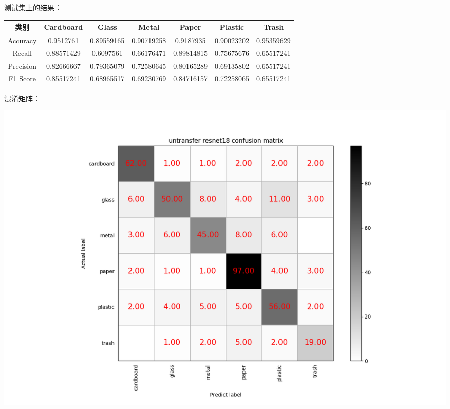 \documentclass[UTF8]{ctexart}
\begin{document}
测试集上的结果：

\begin{tabular}{|c|c|c|c|c|c|c|}
\hline 
类别 & Cardboard & Glass & Metal & Paper & Plastic & Trash \\ 
\hline 
Accuracy &0.9512761 & 0.89559165& 0.90719258& 0.9187935 & 0.90023202& 0.95359629\\
 \hline 
Recall &0.88571429 &0.6097561 & 0.66176471& 0.89814815& 0.75675676& 0.65517241\\ 
\hline 
Precision &0.82666667& 0.79365079& 0.72580645& 0.80165289& 0.69135802& 0.65517241   \\ 
\hline 
F1 Score &0.85517241& 0.68965517 &0.69230769& 0.84716157 &0.72258065& 0.65517241 \\ 
\hline 
\end{tabular}

混淆矩阵：

\includegraphics[scale=0.5]{cm/unres18.png} 
\end{document}
